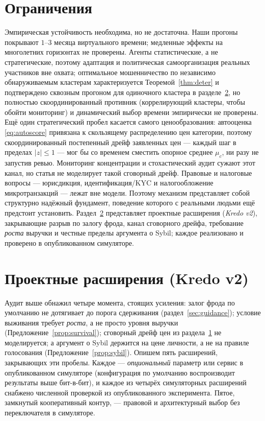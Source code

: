 \documentclass[11pt]{article}
\theoremstyle{plain}
\theoremstyle{definition}
\theoremstyle{remark}
\begin{document}
\section{Ограничения}\label{sec:limitations}

Эмпирическая устойчивость необходима, но не достаточна. Наши прогоны покрывают $1$--$3$ месяца виртуального времени; медленные эффекты на многолетних горизонтах не проверены. Агенты статистические, а не стратегические, поэтому адаптация и политическая самоорганизация реальных участников вне охвата; оптимальное мошенничество по независимо обнаруживаемым кластерам характеризуется Теоремой~\ref{thm:deter} и подтверждено сквозным прогоном для одиночного кластера в разделе~\ref{sec:extensions}, но полностью скоординированный противник (коррелирующий кластеры, чтобы обойти мониторинг) и динамический выбор времени эмпирически не проверены. Ещё один стратегический пробел касается самого ценообразования: автооценка \eqref{eq:autoscore} привязана к скользящему распределению цен категории, поэтому скоординированный постепенный дрейф заявленных цен --- каждый шаг в пределах $|z|\le1$ --- мог бы со временем сместить опорное среднее $\mu_c$, ни разу не запустив ревью. Мониторинг концентрации и стохастический аудит сужают этот канал, но статья не моделирует такой сговорный дрейф. Правовые и налоговые вопросы --- юрисдикция, идентификация/KYC и налогообложение микротранзакций --- лежат вне модели. Поэтому механизм представляет собой структурно надёжный фундамент, поведение которого с реальными людьми ещё предстоит установить. Раздел~\ref{sec:extensions} представляет проектные расширения (\emph{Kredo v2}), закрывающие разрыв по залогу фрода, канал сговорного дрейфа, требование \emph{роста} выручки и честные пределы аргумента о Sybil; каждое реализовано и проверено в опубликованном симуляторе.

\section{Проектные расширения (Kredo v2)}\label{sec:extensions}

Аудит выше обнажил четыре момента, стоящих усиления: залог фрода по умолчанию не дотягивает до порога сдерживания (раздел~\ref{sec:guidance}); условие выживания требует \emph{роста}, а не просто уровня выручки (Предложение~\ref{prop:survival}); сговорный дрейф цен из раздела~\ref{sec:limitations} не моделируется; а аргумент о Sybil держится на цене личности, а не на правиле голосования (Предложение~\ref{prop:sybil}). Опишем пять расширений, закрывающих эти пробелы. Каждое --- \emph{опциональный} параметр или сервис в опубликованном симуляторе (конфигурация по умолчанию воспроизводит результаты выше бит-в-бит), и каждое из четырёх симуляторных расширений снабжено численной проверкой из опубликованного эксперимента. Пятое, замкнутый кооперативный контур, --- правовой и архитектурный выбор без переключателя в симуляторе.
\end{document}
